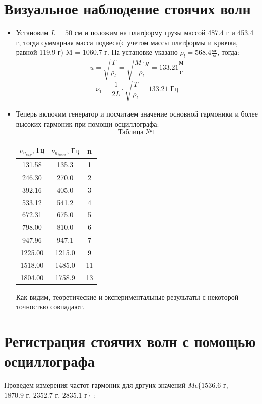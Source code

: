 \documentclass[a4paper,12pt]{article} %
\begin{document}
\section{Визуальное наблюдение стоячих волн}
\begin{itemize}
\item Установим $L = 50\text{ см}$ и положим на платформу грузы массой 487.4 г и 453.4 г, тогда суммарная масса подвеса(с учетом массы платформы и крючка, равной 119.9 г) M = 1060.7 г. На установке указано $\rho_l = 568.4 \frac{\text{мг}}{\text{м}}$, тогда:\\
\[u = \sqrt{\frac{T}{\rho_l}} = \sqrt{\frac{M\cdot g}{\rho_l}} = 133.21 \frac{\text{м}}{\text{с}}\]
\[\nu_1 = \frac{1}{2L}\cdot\sqrt{\frac{T}{\rho_l}}=133.21\text{ Гц}\]
\item Теперь включим генератор и посчитаем значение основной гармоники и более высоких гармоник при помощи осциллографа:
\[\text{Таблица №1}\]
\begin{center}
\begin{tabular}{|c|c|c|}
\hline
$\nu_{n_{exp}}\text{, Гц}$              & $\nu_{n_{theor}}\text{, Гц}$     & n \\ \hline
131.58          & 135.3  & 1     \\ \hline
246.30           & 270.0    & 2     \\ \hline
392.16 & 405.0    & 3     \\ \hline
533.12          & 541.2  & 4     \\ \hline
672.31          & 675.0    & 5     \\ \hline
798.00             & 810.0    & 6     \\ \hline
947.96          & 947.1  & 7     \\ \hline
1225.00            & 1215.0   & 9     \\ \hline
1518.00            & 1485.0   & 11    \\ \hline
1804.00            & 1758.9 & 13    \\ \hline
\end{tabular}
\end{center}
Как видим, теоретические и экспериментальные результаты с некоторой точностью совпадают.
\end{itemize}


\section{Регистрация стоячих волн с помощью осциллографа}
Проведем измерения частот гармоник для дргуих значений $M\epsilon\{1536.6\text{ г, }$ $1870.9\text{ г, }2352.7\text{ г, }2835.1\text{ г}\}$ :
\end{document}
